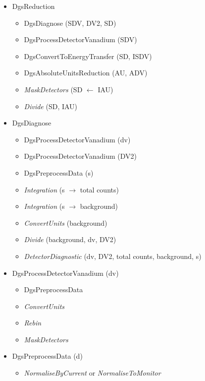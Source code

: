 \begin{itemize}
\item DgsReduction
\begin{itemize}
\item DgsDiagnose (SDV, DV2, SD)
\item DgsProcessDetectorVanadium (SDV)
\item DgsConvertToEnergyTransfer (SD, ISDV)
\item DgsAbsoluteUnitsReduction (AU, ADV)
\item \textit{MaskDetectors} (SD $\leftarrow$ IAU)
\item \textit{Divide} (SD, IAU)
\end{itemize}
\end{itemize}

\begin{itemize}
\item DgsDiagnose
\begin{itemize}
\item DgsProcessDetectorVanadium (dv)
\item DgsProcessDetectorVanadium (DV2)
\item DgsPreprocessData (s)
\item \textit{Integration} (s $\rightarrow$ total counts)
\item \textit{Integration} (s $\rightarrow$ background)
\item \textit{ConvertUnits} (background)
\item \textit{Divide} (background, dv, DV2)
\item \textit{DetectorDiagnostic} (dv, DV2, total counts, background, s)
\end{itemize}
\end{itemize}

\begin{itemize}
\item DgsProcessDetectorVanadium (dv)
\begin{itemize}
\item DgsPreprocessData
\item \textit{ConvertUnits}
\item \textit{Rebin} 
\item \textit{MaskDetectors}
\end{itemize}
\end{itemize}

\begin{itemize}
\item DgsPreprocessData (d)
\begin{itemize}
\item \textit{NormaliseByCurrent} or \textit{NormaliseToMonitor}
\end{itemize}
\end{itemize}

